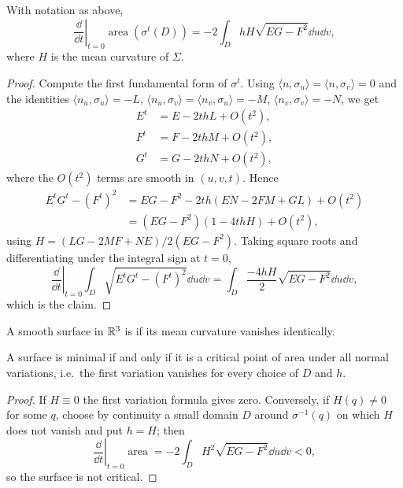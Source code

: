 \documentclass[a4paper]{scrartcl}
\begin{document}
\begin{proposition}
    With notation as above,
    $$
    \left.\frac{\dd}{\dd t}\right|_{t=0}\operatorname{area}\left(\sigma^t(D)\right) = -2\int_D h H \sqrt{EG-F^2}\dd u \dd v,
    $$
    where $H$ is the mean curvature of $\Sigma$.
\end{proposition}
\begin{proof}
    Compute the first fundamental form of $\sigma^t$. Using $\langle n, \sigma_u\rangle = \langle n, \sigma_v\rangle = 0$ and the identities $\langle n_u, \sigma_u\rangle = -L$, $\langle n_u,\sigma_v\rangle = \langle n_v,\sigma_u\rangle = -M$, $\langle n_v, \sigma_v\rangle = -N$, we get
    \begin{align*}
        E^t &= E - 2thL + O(t^2), \\
        F^t &= F - 2thM + O(t^2), \\
        G^t &= G - 2thN + O(t^2),
    \end{align*}
    where the $O(t^2)$ terms are smooth in $(u,v,t)$. Hence
    $$
    \begin{aligned}
    E^tG^t - (F^t)^2 &= EG-F^2 - 2th\left(EN - 2FM + GL\right) + O(t^2) \\
    &= (EG-F^2)\left(1 - 4thH\right) + O(t^2),
    \end{aligned}
    $$
    using $H = (LG-2MF+NE)/2(EG-F^2)$. Taking square roots and differentiating under the integral sign at $t = 0$,
    $$
    \left.\frac{\dd}{\dd t}\right|_{t=0}\int_D\sqrt{E^tG^t-(F^t)^2}\dd u\dd v = \int_D \frac{-4hH}{2}\sqrt{EG-F^2}\dd u \dd v,
    $$
    which is the claim.
\end{proof}

\begin{definition}
    A smooth surface in $\mathbb{R}^3$ is  if its mean curvature vanishes identically.
\end{definition}

\begin{corollary}
    A surface is minimal if and only if it is a critical point of area under all normal variations, i.e.\ the first variation vanishes for every choice of $D$ and $h$.
\end{corollary}
\begin{proof}
    If $H \equiv 0$ the first variation formula gives zero. Conversely, if $H(q) \neq 0$ for some $q$, choose by continuity a small domain $D$ around $\sigma^{-1}(q)$ on which $H$ does not vanish and put $h = H$; then
    $$
    \left.\frac{\dd}{\dd t}\right|_{t=0}\operatorname{area} = -2\int_D H^2\sqrt{EG-F^2}\dd u \dd v < 0,
    $$
    so the surface is not critical.
\end{proof}
\end{document}
